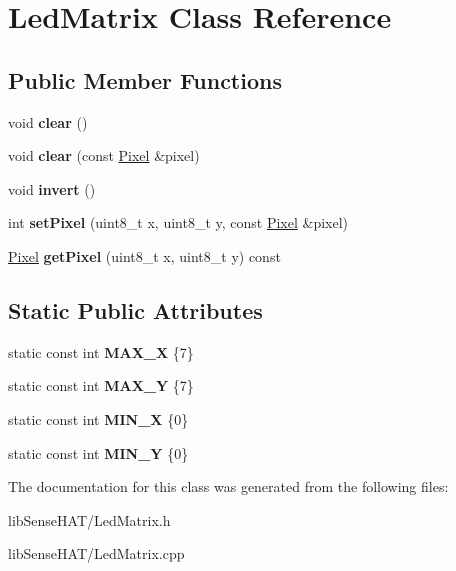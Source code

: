 \hypertarget{class_led_matrix}{}\section{Led\+Matrix Class Reference}
\label{class_led_matrix}
\subsection*{Public Member Functions}
\begin{DoxyCompactItemize}
\item 
\mbox{\label{class_led_matrix_a2737d95498692cc098be8edc8937ada6}} 
void {\bfseries clear} ()
\item 
\mbox{\label{class_led_matrix_ac9de9b5c9b37f13a1d9eec2d3d7970ed}} 
void {\bfseries clear} (const \mbox{\hyperlink{class_pixel}{Pixel}} \&pixel)
\item 
\mbox{\label{class_led_matrix_af1e9e51216169ec51398b259129de5e1}} 
void {\bfseries invert} ()
\item 
\mbox{\label{class_led_matrix_a00eb3db37486902ee8509a95c1ac09fe}} 
int {\bfseries set\+Pixel} (uint8\+\_\+t x, uint8\+\_\+t y, const \mbox{\hyperlink{class_pixel}{Pixel}} \&pixel)
\item 
\mbox{\label{class_led_matrix_a602696c5be92086cd8e19d7ce9f537e2}} 
\mbox{\hyperlink{class_pixel}{Pixel}} {\bfseries get\+Pixel} (uint8\+\_\+t x, uint8\+\_\+t y) const
\end{DoxyCompactItemize}
\subsection*{Static Public Attributes}
\begin{DoxyCompactItemize}
\item 
\mbox{\label{class_led_matrix_a6da341535a246a5395b0a46569618830}} 
static const int {\bfseries M\+A\+X\+\_\+X} \{7\}
\item 
\mbox{\label{class_led_matrix_aa6cf03e172a1efe233aaac293be202bd}} 
static const int {\bfseries M\+A\+X\+\_\+Y} \{7\}
\item 
\mbox{\label{class_led_matrix_a30e3af90d4c9a83aec44e71914f86aa3}} 
static const int {\bfseries M\+I\+N\+\_\+X} \{0\}
\item 
\mbox{\label{class_led_matrix_a4bb052cfec297bc54387decb20a0f17f}} 
static const int {\bfseries M\+I\+N\+\_\+Y} \{0\}
\end{DoxyCompactItemize}


The documentation for this class was generated from the following files\+:\begin{DoxyCompactItemize}
\item 
lib\+Sense\+H\+A\+T/Led\+Matrix.\+h\item 
lib\+Sense\+H\+A\+T/Led\+Matrix.\+cpp\end{DoxyCompactItemize}

